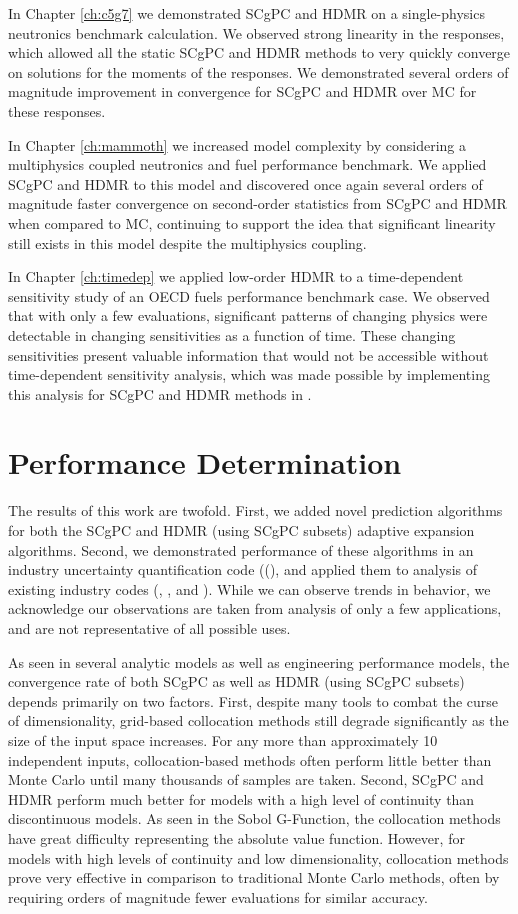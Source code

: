 In Chapter \ref{ch:c5g7} we demonstrated SCgPC and HDMR on a single-physics neutronics benchmark calculation.
We observed strong linearity in the responses, which allowed all the static SCgPC and HDMR methods to very
quickly converge on solutions for the moments of the responses.  We demonstrated several orders of magnitude
improvement in convergence for SCgPC and HDMR over MC for these responses.

In Chapter \ref{ch:mammoth} we increased model complexity by considering a multiphysics coupled neutronics and
fuel performance benchmark.  We applied SCgPC and HDMR to this model and discovered once again several orders
of magnitude faster convergence on second-order statistics from SCgPC and HDMR when compared to MC, continuing
to support the idea that significant linearity still exists in this model despite the multiphysics coupling.

In Chapter \ref{ch:timedep} we applied low-order HDMR to a time-dependent sensitivity study of an OECD fuels
performance benchmark case.  We observed that with only a few evaluations, significant patterns of changing
physics were detectable in changing sensitivities as a function of time.  These changing sensitivities present
valuable information that would not be accessible without time-dependent sensitivity analysis, which was made
possible by implementing this analysis for SCgPC and HDMR methods in \raven{}.

\section{Performance Determination}
The results of this work are twofold.  First, we added novel prediction algorithms for both the SCgPC and HDMR
(using SCgPC subsets) adaptive expansion algorithms.  Second, we demonstrated performance of these algorithms
in an industry uncertainty quantification code (\raven({}), and applied them to analysis of existing industry
codes (\bison{}, \rattlesnake{}, and \mammoth{}).  While we can observe trends in behavior, we acknowledge our
observations are taken from analysis of only a few applications, and are not representative of all possible
uses.

As seen in several analytic models as well as engineering performance models, the convergence rate of both 
SCgPC as well as HDMR (using SCgPC subsets) depends primarily
on two factors. 
First, despite many tools to combat the curse of dimensionality, grid-based collocation methods still degrade
significantly as the size of the input space increases.  For any more than approximately 10 independent inputs, collocation-based
methods often perform little better than Monte Carlo until many thousands of 
samples are taken.  Second, SCgPC and HDMR perform much
better for models with a high level of continuity than discontinuous models.  As seen in the Sobol G-Function, the collocation
methods have great difficulty representing the absolute value function.  
However, for models with high levels of continuity and low dimensionality, collocation methods prove very effective in comparison
to traditional Monte Carlo methods, often by requiring orders of magnitude fewer evaluations for similar
accuracy.

